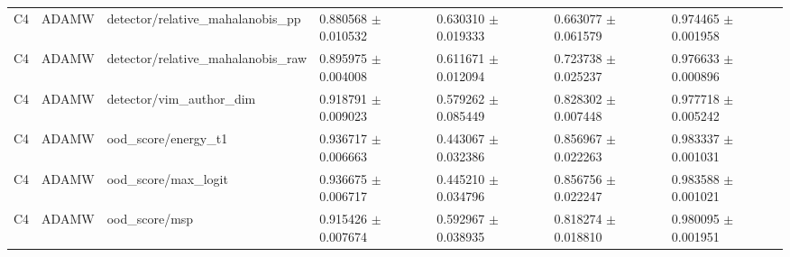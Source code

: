 \begin{longtable}{lllllll}
C4 & ADAMW & detector/relative\_mahalanobis\_pp & 0.880568 $\pm$ 0.010532 & 0.630310 $\pm$ 0.019333 & 0.663077 $\pm$ 0.061579 & 0.974465 $\pm$ 0.001958 \\
C4 & ADAMW & detector/relative\_mahalanobis\_raw & 0.895975 $\pm$ 0.004008 & 0.611671 $\pm$ 0.012094 & 0.723738 $\pm$ 0.025237 & 0.976633 $\pm$ 0.000896 \\
C4 & ADAMW & detector/vim\_author\_dim & 0.918791 $\pm$ 0.009023 & 0.579262 $\pm$ 0.085449 & 0.828302 $\pm$ 0.007448 & 0.977718 $\pm$ 0.005242 \\
C4 & ADAMW & ood\_score/energy\_t1 & 0.936717 $\pm$ 0.006663 & 0.443067 $\pm$ 0.032386 & 0.856967 $\pm$ 0.022263 & 0.983337 $\pm$ 0.001031 \\
C4 & ADAMW & ood\_score/max\_logit & 0.936675 $\pm$ 0.006717 & 0.445210 $\pm$ 0.034796 & 0.856756 $\pm$ 0.022247 & 0.983588 $\pm$ 0.001021 \\
C4 & ADAMW & ood\_score/msp & 0.915426 $\pm$ 0.007674 & 0.592967 $\pm$ 0.038935 & 0.818274 $\pm$ 0.018810 & 0.980095 $\pm$ 0.001951 \\
\end{longtable}
